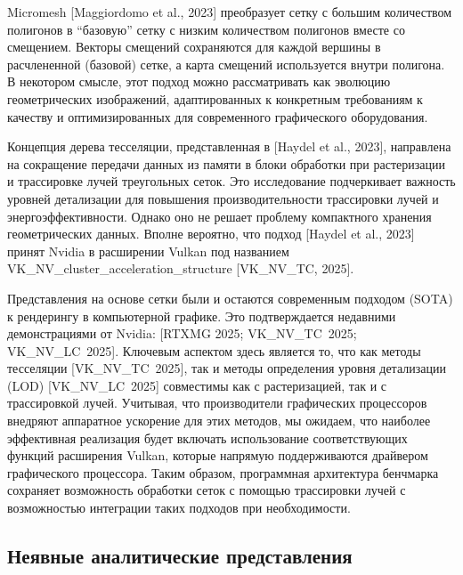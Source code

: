 \documentclass[a4paper,hidelinks,12pt]{article}
\begin{document}
Micromesh [Maggiordomo et al., 2023] преобразует сетку с большим количеством полигонов в “базовую” сетку с низким количеством полигонов вместе со смещением. Векторы смещений сохраняются для каждой вершины в расчлененной (базовой) сетке, а карта смещений используется внутри полигона. В некотором смысле, этот подход можно рассматривать как эволюцию геометрических изображений, адаптированных к конкретным требованиям к качеству и оптимизированных для современного графического оборудования. 

Концепция дерева тесселяции, представленная в [Haydel et al., 2023], направлена на сокращение передачи данных из памяти в блоки обработки при растеризации и трассировке лучей треугольных сеток. Это исследование подчеркивает важность уровней детализации для повышения производительности трассировки лучей и энергоэффективности. Однако оно не решает проблему компактного хранения геометрических данных. Вполне вероятно, что подход [Haydel et al., 2023] принят Nvidia в расширении Vulkan под названием VK\_NV\_cluster\_acceleration\_structure [VK\_NV\_TC, 2025].

Представления на основе сетки были и остаются современным подходом (SOTA) к рендерингу в компьютерной графике. 
Это подтверждается недавними демонстрациями от Nvidia: [RTXMG 2025; VK\_NV\_TC\ 2025; VK\_NV\_LC\ 2025]. 
Ключевым аспектом здесь является то, что как методы тесселяции [VK\_NV\_TC\ 2025], так и методы определения уровня детализации
 (LOD) [VK\_NV\_LC\ 2025] совместимы как с растеризацией, так и с трассировкой лучей. Учитывая, что производители 
 графических процессоров внедряют аппаратное ускорение для этих методов, мы ожидаем, что наиболее эффективная реализация 
 будет включать использование соответствующих функций расширения Vulkan, которые напрямую поддерживаются драйвером графического 
 процессора. Таким образом, программная архитектура бенчмарка сохраняет возможность обработки сеток с помощью трассировки лучей с возможностью интеграции таких подходов при необходимости. 

\subsection{Неявные аналитические представления}
\end{document}
